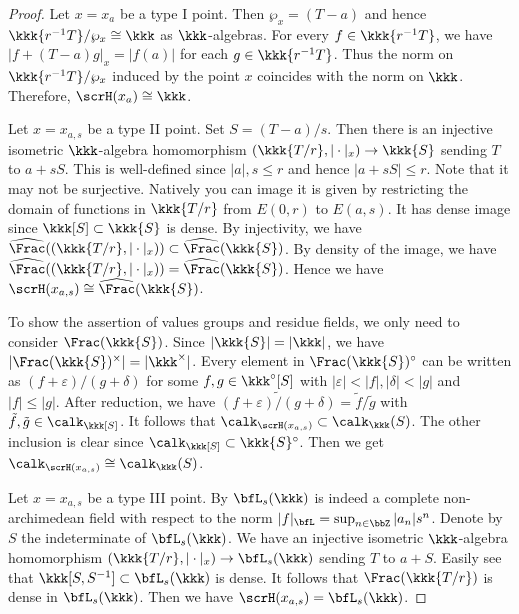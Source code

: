     \begin{proof}
        Let \(x=x_a\) be a type I point.
        Then \(\wp_x = (T - a)\) and hence \(\kkk\{r^{-1}T\}/\wp_x \cong \kkk\) as \(\kkk\)-algebras.
        For every \(f \in \kkk\{r^{-1}T\}\), we have \(|f+(T - a)g|_x = |f(a)|\) for each \(g \in \kkk\{r^{-1}T\}\).
        Thus the norm on \(\kkk\{r^{-1}T\}/\wp_x\) induced by the point \(x\) coincides with the norm on \(\kkk\).
        Therefore, \(\scrH(x_a) \cong \kkk\).

        Let \(x = x_{a,s}\) be a type II point.
        Set \(S = (T - a)/s\).
        Then there is an injective isometric \(\kkk\)-algebra homomorphism \((\kkk\{T/r\},|\cdot|_x) \to \kkk\{S\}\) sending \(T\) to \(a + sS\).
        This is well-defined since \(|a|,s \leq r\) and hence \(|a + sS| \leq r\).
        Note that it may not be surjective.
        Natively you can image it is given by restricting the domain of functions in \(\kkk\{T/r\}\) from \(E(0,r)\) to \(E(a,s)\).
        It has dense image since \(\kkk[S] \subset \kkk\{S\}\) is dense.
        By injectivity, we have \(\widehat{\Frac}((\kkk\{T/r\},|\cdot|_x)) \subset \widehat{\Frac}(\kkk\{S\})\).
        By density of the image, we have \(\widehat{\Frac}((\kkk\{T/r\},|\cdot|_x)) = \widehat{\Frac}(\kkk\{S\})\).
        Hence we have \(\scrH(x_{a,s}) \cong \widehat{\Frac}(\kkk\{S\})\).

        To show the assertion of values groups and residue fields, we only need to consider \(\Frac(\kkk\{S\})\).
        Since \(|\kkk\{S\}| = |\kkk|\), we have \(|\Frac(\kkk\{S\})^\times| = |\kkk^\times|\).
        Every element in \(\Frac(\kkk\{S\})^\circ\) can be written as \((f+\varepsilon)/(g+\delta)\) for some \(f,g \in \kkk^\circ[S]\) with \(|\varepsilon|<|f|, |\delta|<|g|\) and \(|f|\leq |g|\).
        After reduction, we have \(\widetilde{(f+\varepsilon)/(g+\delta)} = \tilde{f}/\tilde{g}\) with \(\tilde{f}, \tilde{g} \in \calk_\kkk[S]\).
        It follows that \(\calk_{\scrH(x_{a,s})} \subset \calk_\kkk(S)\).
        The other inclusion is clear since \(\calk_\kkk[S] \subset \kkk\{S\}^\circ\).
        Then we get \(\calk_{\scrH(x_{a,s})} \cong \calk_\kkk(S)\).

        Let \(x = x_{a,s}\) be a type III point.
        By  \(\bfL_{s}(\kkk)\) is indeed a complete non-archimedean field with respect to the norm \(|f|_{\bfL} = \sup_{n \in \bbZ} |a_n| s^n\).
        Denote by \(S\) the indeterminate of \(\bfL_{s}(\kkk)\).
        We have an injective isometric \(\kkk\)-algebra homomorphism \((\kkk\{T/r\},|\cdot|_x) \to \bfL_{s}(\kkk)\) sending \(T\) to \(a + S\).
        Easily see that \(\kkk[S,S^{-1}] \subset \bfL_{s}(\kkk)\) is dense.
        It follows that \(\Frac(\kkk\{T/r\})\) is dense in \(\bfL_{s}(\kkk)\).
        Then we have \(\scrH(x_{a,s}) = \bfL_{s}(\kkk)\).
        

\end{proof}

